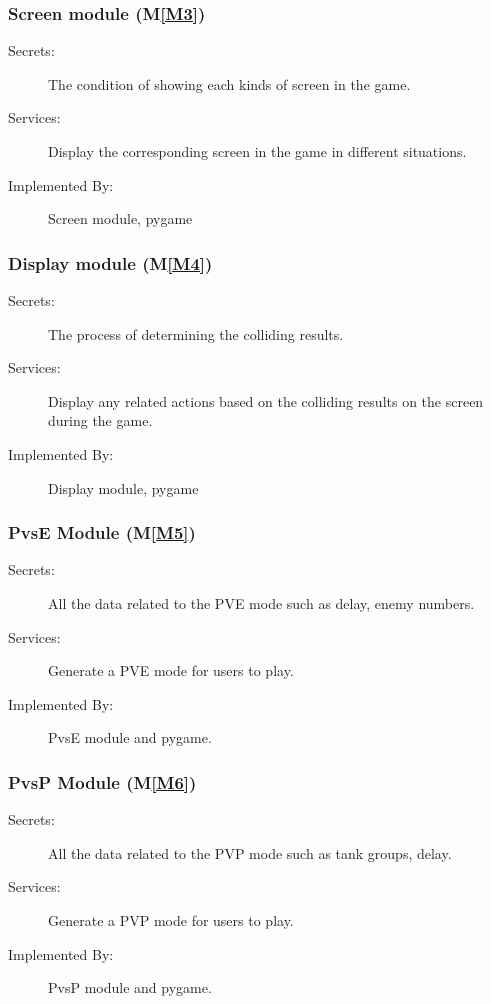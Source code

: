 \documentclass[12pt, titlepage]{article}
\newcommand{\mref}[1]{M\ref{#1}}
\begin{document}
\subsubsection{Screen module (\mref{M3})}
\begin{description}
\item[Secrets:] The condition of showing each kinds of screen in the game.
\item[Services:] Display the corresponding screen in the game in different situations.
\item[Implemented By:] Screen module, pygame
\end{description}

\subsubsection{Display module (\mref{M4})}
\begin{description}
\item[Secrets:] The process of determining the colliding results.
\item[Services:] Display any related actions based on the colliding results on the screen during the game.
\item[Implemented By:] Display module, pygame
\end{description}

\subsubsection{PvsE Module (\mref{M5})}
\begin{description}
\item[Secrets:] All the data related to the PVE mode such as delay, enemy numbers.
\item[Services:] Generate a PVE mode for users to play.
\item[Implemented By:] PvsE module and pygame.
\end{description}

\subsubsection{PvsP Module (\mref{M6})}
\begin{description}
\item[Secrets:] All the data related to the PVP mode such as tank groups, delay.
\item[Services:] Generate a PVP mode for users to play.
\item[Implemented By:] PvsP module and pygame.
\end{description}
\end{document}
